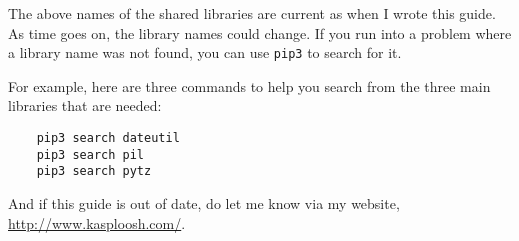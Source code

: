 The above names of the shared libraries are current as when I wrote
this guide. As time goes on, the library names could change. If
you run into a problem where a library name was not found, you
can use \texttt{pip3} to search for it.

For example, here are three commands to help you search from the
three main libraries that are needed:

\begin{verbatim}
    pip3 search dateutil
    pip3 search pil
    pip3 search pytz
\end{verbatim}

And if this guide is out of date, do let me know via my website,
\url{http://www.kasploosh.com/}.
